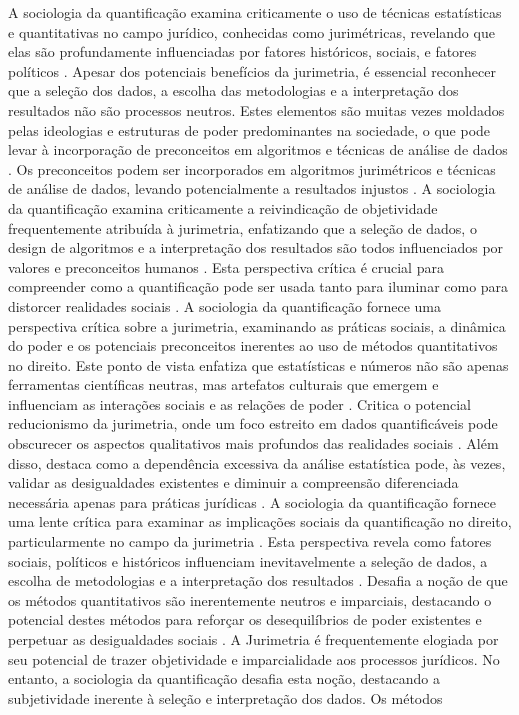 A sociologia da quantificação examina criticamente o uso de técnicas estatísticas e quantitativas no campo jurídico, conhecidas como jurimétricas, revelando que elas são profundamente influenciadas por fatores históricos, sociais, e fatores políticos \cite{johnson2022}. Apesar dos potenciais benefícios da jurimetria, é essencial reconhecer que a seleção dos dados, a escolha das metodologias e a interpretação dos resultados não são processos neutros. Estes elementos são muitas vezes moldados pelas ideologias e estruturas de poder predominantes na sociedade, o que pode levar à incorporação de preconceitos em algoritmos e técnicas de análise de dados \cite{smith2021}. Os preconceitos podem ser incorporados em algoritmos jurimétricos e técnicas de análise de dados, levando potencialmente a resultados injustos \cite{10.1057/s41599-020-00557-0,de2010jurimetrics}. A sociologia da quantificação examina criticamente a reivindicação de objetividade frequentemente atribuída à jurimetria, enfatizando que a seleção de dados, o design de algoritmos e a interpretação dos resultados são todos influenciados por valores e preconceitos humanos \cite{10.1057/s41599-020-00557 -0,de2010jurimetria}. Esta perspectiva crítica é crucial para compreender como a quantificação pode ser usada tanto para iluminar como para distorcer realidades sociais \cite{10.1057/s41599-020-00557-0,de2010jurimetrics}. A sociologia da quantificação fornece uma perspectiva crítica sobre a jurimetria, examinando as práticas sociais, a dinâmica do poder e os potenciais preconceitos inerentes ao uso de métodos quantitativos no direito. Este ponto de vista enfatiza que estatísticas e números não são apenas ferramentas científicas neutras, mas artefatos culturais que emergem e influenciam as interações sociais e as relações de poder \cite{10.1057/s41599-020-00557-0,de2010jurimetrics}. Critica o potencial reducionismo da jurimetria, onde um foco estreito em dados quantificáveis pode obscurecer os aspectos qualitativos mais profundos das realidades sociais \cite{10.1057/s41599-020-00557-0,de2010jurimetrics}. Além disso, destaca como a dependência excessiva da análise estatística pode, às vezes, validar as desigualdades existentes e diminuir a compreensão diferenciada necessária apenas para práticas jurídicas \cite{10.1057/s41599-020-00557-0,de2010jurimetrics}. A sociologia da quantificação fornece uma lente crítica para examinar as implicações sociais da quantificação no direito, particularmente no campo da jurimetria \cite{10.1057/s41599-020-00557-0,de2010jurimetrics}. Esta perspectiva revela como fatores sociais, políticos e históricos influenciam inevitavelmente a seleção de dados, a escolha de metodologias e a interpretação dos resultados \cite{10.1057/s41599-020-00557-0,de2010jurimetrics}. Desafia a noção de que os métodos quantitativos são inerentemente neutros e imparciais, destacando o potencial destes métodos para reforçar os desequilíbrios de poder existentes e perpetuar as desigualdades sociais \cite{10.1057/s41599-020-00557-0,de2010jurimetrics}. A Jurimetria é frequentemente elogiada por seu potencial de trazer objetividade e imparcialidade aos processos jurídicos. No entanto, a sociologia da quantificação desafia esta noção, destacando a subjetividade inerente à seleção e interpretação dos dados. Os métodos 